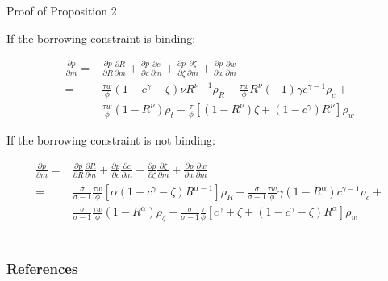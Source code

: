 \documentclass[10pt]{beamer}
\begin{document}
\begin{frame}[label=proof]{Proof of Proposition 2}

If the borrowing constraint is binding:

\begin{align*} 
\frac{\partial p}{\partial m} =&\frac{\partial p}{\partial R}\frac{\partial R}{\partial m}+\frac{\partial p}{\partial c}\frac{\partial c}{\partial m}+\frac{\partial p}{\partial \zeta}\frac{\partial \zeta}{\partial m}+\frac{\partial p}{\partial w}\frac{\partial w}{\partial m}  \\
=& \frac{\tau w}{\phi}(1-c^\gamma-\zeta)\nu R^{\nu-1} \rho_R+ \frac{\tau w}{\phi} R^\nu(-1)\gamma c^{\gamma-1} \rho_c +\\  
& \frac{\tau w}{\phi}(1-R^\nu) \rho_t+\frac{\tau}{\phi}[(1-R^\nu)\zeta+(1-c^\gamma)R^\nu] \rho_w
\end{align*} 

If the borrowing constraint is not binding:

\begin{align*} 
\frac{\partial p}{\partial m} =&\frac{\partial p}{\partial R}\frac{\partial R}{\partial m}+\frac{\partial p}{\partial c}\frac{\partial c}{\partial m}+\frac{\partial p}{\partial \zeta}\frac{\partial \zeta}{\partial m}+\frac{\partial p}{\partial w}\frac{\partial w}{\partial m}  \\
=& \frac{\sigma}{\sigma-1}\frac{\tau w}{\phi}[\alpha(1-c^\gamma-\zeta)R^{\alpha-1}] \rho_R + \frac{\sigma}{\sigma-1}\frac{\tau w}{\phi}\gamma(1-R^\alpha)c^{\gamma-1} \rho_c + \\
& \frac{\sigma}{\sigma-1}\frac{\tau w}{\phi} (1-R^\alpha) \rho_\zeta + \frac{\sigma}{\sigma-1}\frac{\tau}{\phi}[c^\gamma+\zeta+(1-c^\gamma-\zeta)R^\alpha] \rho_w
\end{align*} \\
\hyperlink{Proposition}{}


\end{frame}

\begin{frame}[allowframebreaks]
\frametitle{References}
    \footnotesize
    
\end{frame}
\end{document}
